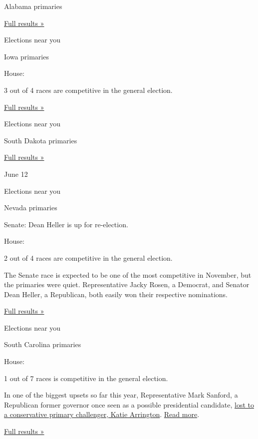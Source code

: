 Alabama primaries

\href{https://www.nytimes3xbfgragh.onion/interactive/2018/06/05/us/elections/results-alabama-primary-elections.html}{Full
results »}

Elections near you

Iowa primaries

House:

3 out of 4 races are competitive in the general election.

\href{https://www.nytimes3xbfgragh.onion/interactive/2018/06/05/us/elections/results-iowa-primary-elections.html}{Full
results »}

Elections near you

South Dakota primaries

\href{https://www.nytimes3xbfgragh.onion/interactive/2018/06/05/us/elections/results-south-dakota-primary-elections.html}{Full
results »}

June 12

Elections near you

Nevada primaries

Senate: Dean Heller is up for re-election.

House:

2 out of 4 races are competitive in the general election.

The Senate race is expected to be one of the most competitive in
November, but the primaries were quiet. Representative Jacky Rosen, a
Democrat, and Senator Dean Heller, a Republican, both easily won their
respective nominations.

\href{https://www.nytimes3xbfgragh.onion/interactive/2018/06/12/us/elections/results-nevada-primary-elections.html}{Full
results »}

Elections near you

South Carolina primaries

House:

1 out of 7 races is competitive in the general election.

In one of the biggest upsets so far this year, Representative Mark
Sanford, a Republican former governor once seen as a possible
presidential candidate,
\href{https://www.nytimes3xbfgragh.onion/2018/06/12/us/politics/primary-south-carolina-virginia-nevada.html}{lost
to a conservative primary challenger, Katie Arrington}.
\href{https://www.nytimes3xbfgragh.onion/2018/06/12/us/politics/mark-sanford-trump.html}{Read
more}.

\href{https://www.nytimes3xbfgragh.onion/interactive/2018/06/12/us/elections/results-south-carolina-primary-elections.html}{Full
results »}


